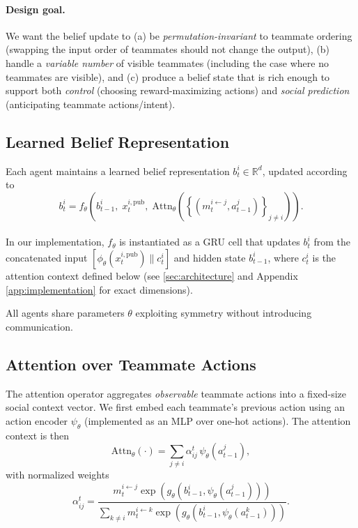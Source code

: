 \documentclass{article}
\theoremstyle{plain}
\theoremstyle{definition}
\theoremstyle{remark}
\begin{document}
\paragraph{Design goal.}
We want the belief update to (a) be \emph{permutation-invariant} to teammate ordering (swapping the input order of teammates should not change the output), (b) handle a \emph{variable number} of visible teammates (including the case where no teammates are visible), and (c) produce a belief state that is rich enough to support both \emph{control} (choosing reward-maximizing actions) and \emph{social prediction} (anticipating teammate actions/intent).

\subsection{Learned Belief Representation}

Each agent maintains a learned belief representation $b_t^i \in \mathbb{R}^d$, updated according to
\begin{equation}
b_t^i
=
f_\theta\!\left(
b_{t-1}^i,\;
x_t^{i,\mathrm{pub}},\;
\mathrm{Attn}_\theta\!\left(
\left\{ (m_t^{i \leftarrow j}, a_{t-1}^j) \right\}_{j \neq i}
\right)
\right).
\end{equation}

\paragraph{}
In our implementation, $f_\theta$ is instantiated as a GRU cell that updates $b_t^i$ from the concatenated input $[\phi_\theta(x_t^{i,\mathrm{pub}}) \parallel c_t^i]$ and hidden state $b_{t-1}^i$, where $c_t^i$ is the attention context defined below (see \cref{sec:architecture} and Appendix \ref{app:implementation} for exact dimensions).

All agents share parameters $\theta$ exploiting symmetry without introducing communication.


\subsection{Attention over Teammate Actions}
The attention operator aggregates \emph{observable} teammate actions into a fixed-size social context vector.
We first embed each teammate's previous action using an action encoder $\psi_\theta$ (implemented as an MLP over one-hot actions).
The attention context is then
\begin{equation}
\mathrm{Attn}_\theta(\cdot)
=
\sum_{j \neq i} \alpha_{ij}^t \, \psi_\theta(a_{t-1}^j),
\end{equation}
with normalized weights
\begin{equation}
\alpha_{ij}^t
=
\frac{
 m_t^{i \leftarrow j}
\exp\!\left(
 g_\theta\!\left(b_{t-1}^i, \psi_\theta(a_{t-1}^j)\right)
\right)
}{
\sum\limits_{k \neq i}
 m_t^{i \leftarrow k}
\exp\!\left(
 g_\theta\!\left(b_{t-1}^i, \psi_\theta(a_{t-1}^k)\right)
\right)
}.
\end{equation}
\end{document}
